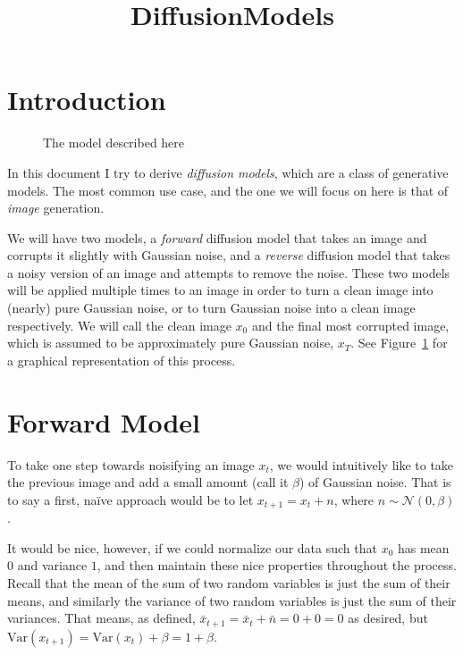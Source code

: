\documentclass[11pt,dvipsnames]{article}
\begin{document}
\title{DiffusionModels}

\author{}

\maketitle

\section*{Introduction}

\begin{figure}
\caption{The model described here}
\label{fig:model}
\end{figure}

In this document I try to derive \emph{diffusion models}, which are a class of
generative models. The most common use case, and the one we will
focus on here is that of \emph{image} generation.

We will have two models, a \emph{forward} diffusion model that takes an image and
corrupts it slightly with Gaussian noise, and a \emph{reverse} diffusion model that
takes a noisy version of an image and attempts to remove the noise. These two models
will be applied multiple times to an image in order to turn a clean image into (nearly)
pure Gaussian noise, or to turn Gaussian noise into a clean image respectively.
We will call the clean image $x_0$ and the final most corrupted image, which is assumed
to be approximately pure Gaussian noise, $x_T$. See Figure~\ref{fig:model} for a graphical
representation of this process.

\section{Forward Model}
To take one step towards noisifying an image $x_t$, we would intuitively like to take
the previous image and add a small amount (call it $\beta$) of Gaussian noise. That is to say a first,
na\"ive approach would be to let $x_{t+1} = x_t + n$, where $n \sim \mathcal{N}(0, \beta)$.

It would be nice, however, if we could normalize our data such that $x_0$ has mean $0$
and variance $1$, and then maintain these nice properties throughout the process.
Recall that the mean of the sum of two random variables is just the sum of their means,
and similarly the variance of two random variables is just the sum of their variances.
That means, as defined, $\bar x_{t+1} = \bar x_t + \bar{n} = 0 + 0 = 0$ as desired, but
$\text{Var}(x_{t+1}) = \text{Var}(x_t) + \beta = 1 + \beta$.
\end{document}

